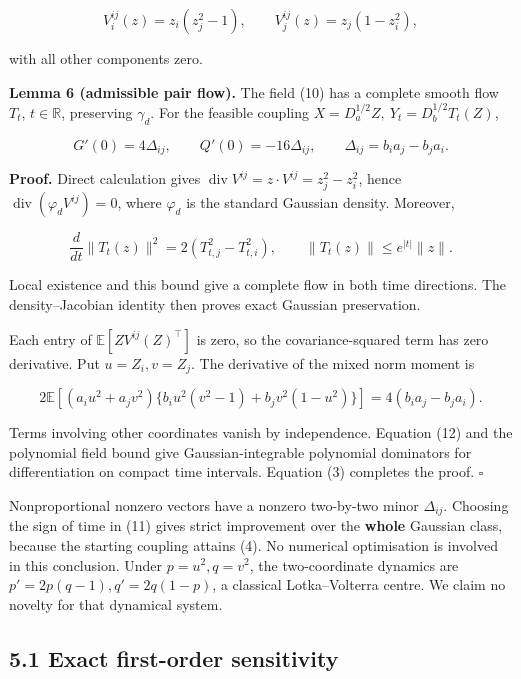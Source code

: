 \documentclass[
  british,
  11pt,
  a4paper,
]{article}
\begin{document}
\[
V^{ij}_i(z)=z_i(z_j^2-1),\qquad
V^{ij}_j(z)=z_j(1-z_i^2),                                      \tag{10}
\]

with all other components zero.

\textbf{Lemma 6 (admissible pair flow).} The field (10) has a complete
smooth flow \(T_t\), \(t\in\mathbb R\), preserving \(\gamma_d\). For the
feasible coupling \(X=D_a^{1/2}Z,\ Y_t=D_b^{1/2}T_t(Z)\),

\[
G'(0)=4\Delta_{ij},\qquad Q'(0)=-16\Delta_{ij},\qquad
\Delta_{ij}=b_i a_j-b_j a_i.                                  \tag{11}
\]

\textbf{Proof.} Direct calculation gives
\(\operatorname{div}V^{ij}=z\cdot V^{ij}=z_j^2-z_i^2\), hence
\(\operatorname{div}(\varphi_d V^{ij})=0\), where \(\varphi_d\) is the
standard Gaussian density. Moreover,

\[
\frac{d}{dt}\|T_t(z)\|^2=2(T_{t,j}^2-T_{t,i}^2),\qquad
\|T_t(z)\|\leq e^{|t|}\|z\|.                                  \tag{12}
\]

Local existence and this bound give a complete flow in both time
directions. The density--Jacobian identity then proves exact Gaussian
preservation.

Each entry of \(\mathbb E[ZV^{ij}(Z)^\top]\) is zero, so the
covariance-squared term has zero derivative. Put \(u=Z_i,v=Z_j\). The
derivative of the mixed norm moment is

\[
2\mathbb E[(a_i u^2+a_j v^2)
 \{b_i u^2(v^2-1)+b_j v^2(1-u^2)\}]
=4(b_i a_j-b_j a_i).
\]

Terms involving other coordinates vanish by independence. Equation (12)
and the polynomial field bound give Gaussian-integrable polynomial
dominators for differentiation on compact time intervals. Equation (3)
completes the proof. \(\square\)

Nonproportional nonzero vectors have a nonzero two-by-two minor
\(\Delta_{ij}\). Choosing the sign of time in (11) gives strict
improvement over the \textbf{whole} Gaussian class, because the starting
coupling attains (4). No numerical optimisation is involved in this
conclusion. Under \(p=u^2,q=v^2\), the two-coordinate dynamics are
\(p'=2p(q-1),q'=2q(1-p)\), a classical Lotka--Volterra centre. We claim
no novelty for that dynamical system.

\subsection{5.1 Exact first-order
sensitivity}\label{exact-first-order-sensitivity}
\end{document}
